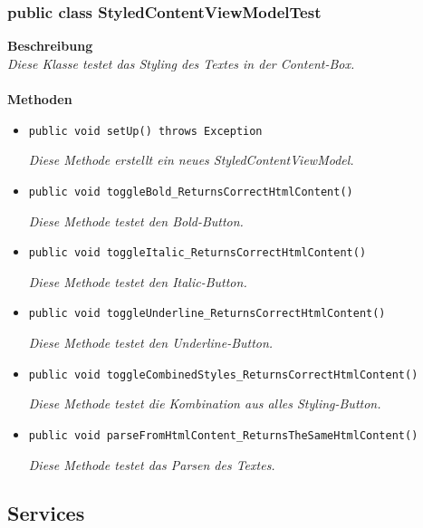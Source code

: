 \documentclass[a4paper]{scrreprt}
\begin{document}
	\subsubsection{public class StyledContentViewModelTest}
	\textbf{Beschreibung}\\
	\textit{Diese Klasse testet das Styling des Textes in der Content-Box.}\\
	\\	
	\textbf{Methoden}
	\begin{itemize}
		
		\item\texttt{{public void setUp() throws Exception}}
		
		\textit{Diese Methode erstellt ein neues StyledContentViewModel.}
		
		\item\texttt{{public void toggleBold\_ReturnsCorrectHtmlContent()}}
		
		\textit{Diese Methode testet den Bold-Button.}
		
		\item\texttt{{public void toggleItalic\_ReturnsCorrectHtmlContent()}}
		
		\textit{Diese Methode testet den Italic-Button.}
		
		\item\texttt{{public void toggleUnderline\_ReturnsCorrectHtmlContent()}}
		
		\textit{Diese Methode testet den Underline-Button.}
		
		\item\texttt{{public void toggleCombinedStyles\_ReturnsCorrectHtmlContent()}}
		
		\textit{Diese Methode testet die Kombination aus alles Styling-Button.}
		
		\item\texttt{{public void parseFromHtmlContent\_ReturnsTheSameHtmlContent()}}
		
		\textit{Diese Methode testet das Parsen des Textes.}
		
	\end{itemize}
	\subsection{Services}
\end{document}
